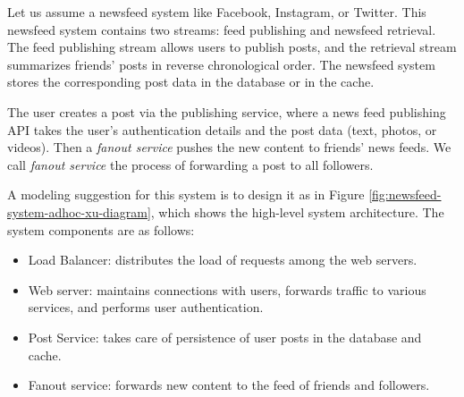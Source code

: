 \documentclass[sigconf]{acmart}
\begin{document}
Let us assume a newsfeed system like Facebook, Instagram, or Twitter. This newsfeed system contains two streams: feed publishing and newsfeed retrieval. The feed publishing stream allows users to publish posts, and the retrieval stream summarizes friends' posts in reverse chronological order. The newsfeed system stores the corresponding post data in the database or in the cache.

The user creates a post via the publishing service, where a news feed publishing API takes the user's authentication details and the post data (text, photos, or videos). Then a \textit{fanout service} pushes the new content to friends' news feeds. We call \textit{fanout service} the process of forwarding a post to all followers. 

A modeling suggestion for this system is to design it as in Figure    \ref{fig:newsfeed-system-adhoc-xu-diagram}, 
which shows the high-level system architecture. The system components are as follows:
\begin{itemize}
    \item Load Balancer: distributes the load of requests among the web servers.
    \item Web server: maintains connections with users, forwards traffic to various services, and performs user authentication.
    \item Post Service: takes care of persistence of user posts in the database and cache.
    \item Fanout service: forwards new content to the feed of friends and followers.
\end{itemize}
\end{document}
